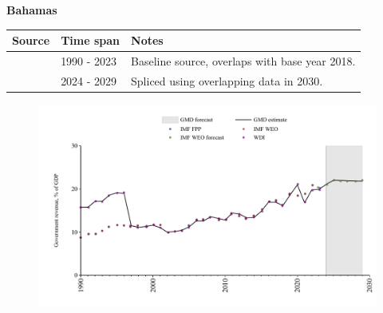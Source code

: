 \documentclass[12pt,a4paper,landscape]{article}
\begin{document}
\begin{adjustbox}{max totalsize={\paperwidth}{\paperheight},center}
\begin{minipage}[t][\textheight][t]{\textwidth}
\vspace*{0.5cm}
{}
\begin{center}
{\Large\bfseries Bahamas}
\end{center}
\vspace{0.5cm}
\begin{table}[H]
\centering
\small
\begin{tabular}{|l|l|l|}
\hline
\textbf{Source} & \textbf{Time span} & \textbf{Notes} \\
\hline
\rowcolor{white}\cite{WDI}& 1990 - 2023 &Baseline source, overlaps with base year 2018.\\
\rowcolor{lightgray}\cite{IMF_WEO_forecast}& 2024 - 2029 &Spliced using overlapping data in 2030.\\
\hline
\end{tabular}
\end{table}
\begin{figure}[H]
\centering
\includegraphics[width=\textwidth,height=0.6\textheight,keepaspectratio]{graphs/BHS_govrev_GDP.pdf}
\end{figure}
\end{minipage}
\end{adjustbox}
\end{document}

